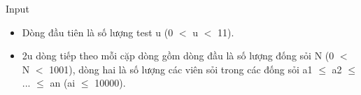 Input
\begin{itemize}
	\item     Dòng đầu tiên là số lượng test u (0 $<$ u $<$ 11).   
	\item     2u dòng tiếp theo mỗi cặp dòng gồm dòng đầu là số lượng đống sỏi N (0 $<$ N $<$ 1001), dòng hai là số lượng các viên sỏi trong các đống sỏi a1  $\le$  a2  $\le$  ...  $\le$  an (ai  $\le$  10000).   
\end{itemize}